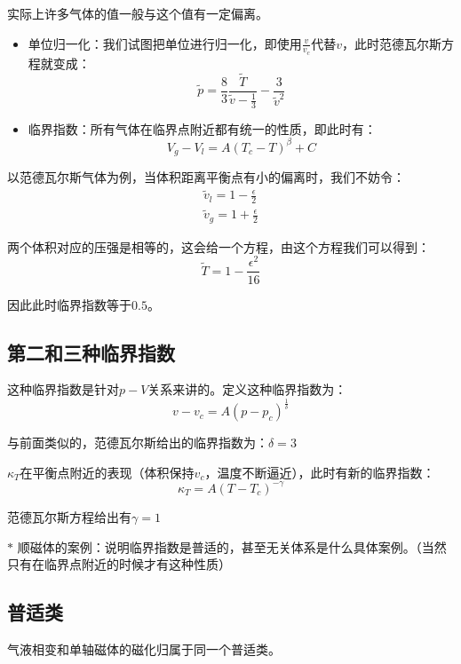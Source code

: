 \documentclass[a4paper, 10pt, openany]{book}%
\begin{document}
实际上许多气体的值一般与这个值有一定偏离。

\begin{itemize}
\item 单位归一化：我们试图把单位进行归一化，即使用$\frac{v}{v_c}$代替$v$，此时范德瓦尔斯方程就变成：
\begin{equation}
\tilde{p}=\frac{8}{3}\frac{\tilde{T}}{\tilde{v}-\frac{1}{3}}-\frac{3}{\tilde{v}^2}
\end{equation}

\item 临界指数：所有气体在临界点附近都有统一的性质，即此时有：
\begin{equation}
V_g-V_l=A(T_c-T)^\beta+C
\end{equation}
\end{itemize}

以范德瓦尔斯气体为例，当体积距离平衡点有小的偏离时，我们不妨令：
\begin{align}
\tilde{v}_l=1-\frac{\epsilon}{2}\\
\tilde{v}_g=1+\frac{\epsilon}{2}
\end{align}

两个体积对应的压强是相等的，这会给一个方程，由这个方程我们可以得到：
\begin{equation}
\tilde{T}=1-\frac{\epsilon^2}{16}
\end{equation}

因此此时临界指数等于$0.5$。

\subsection{第二和三种临界指数}
这种临界指数是针对$p-V$关系来讲的。定义这种临界指数为：
\begin{equation}
v-v_c=A(p-p_c)^\frac{1}{\delta}
\end{equation}

与前面类似的，范德瓦尔斯给出的临界指数为：$\delta=3$

$\kappa_T$在平衡点附近的表现（体积保持$v_c$，温度不断逼近），此时有新的临界指数：
\begin{equation}
\kappa_T=A(T-T_c)^{-\gamma}
\end{equation}

范德瓦尔斯方程给出有$\gamma=1$

$*$ 顺磁体的案例：说明临界指数是普适的，甚至无关体系是什么具体案例。（当然只有在临界点附近的时候才有这种性质）

\subsection{普适类}
气液相变和单轴磁体的磁化归属于同一个普适类。
\end{document}
